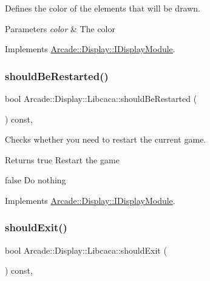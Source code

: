 Defines the color of the elements that will be drawn. 


\begin{DoxyParams}{Parameters}
{\em color} & The color \\
\hline
\end{DoxyParams}


Implements \mbox{\hyperlink{classArcade_1_1Display_1_1IDisplayModule_a9f81148f93a249d6fc91307819911b4e}{Arcade\+::\+Display\+::\+I\+Display\+Module}}.

\mbox{\label{classArcade_1_1Display_1_1Libcaca_acccbe7d671cc860dded39937073d2298}} 
\subsubsection{\texorpdfstring{shouldBeRestarted()}{shouldBeRestarted()}}
{\footnotesize\ttfamily bool Arcade\+::\+Display\+::\+Libcaca\+::should\+Be\+Restarted (\begin{DoxyParamCaption}{ }\end{DoxyParamCaption}) const\hspace{0.3cm}{\ttfamily [final]}, {\ttfamily [virtual]}}



Checks whether you need to restart the current game. 

\begin{DoxyReturn}{Returns}
true Restart the game 

false Do nothing 
\end{DoxyReturn}


Implements \mbox{\hyperlink{classArcade_1_1Display_1_1IDisplayModule_adc5d499229aa5899bbd4bae14f00cb27}{Arcade\+::\+Display\+::\+I\+Display\+Module}}.

\mbox{\label{classArcade_1_1Display_1_1Libcaca_a5920c296d51d72df55b5079c0749031e}} 
\subsubsection{\texorpdfstring{shouldExit()}{shouldExit()}}
{\footnotesize\ttfamily bool Arcade\+::\+Display\+::\+Libcaca\+::should\+Exit (\begin{DoxyParamCaption}{ }\end{DoxyParamCaption}) const\hspace{0.3cm}{\ttfamily [final]}, {\ttfamily [virtual]}}



